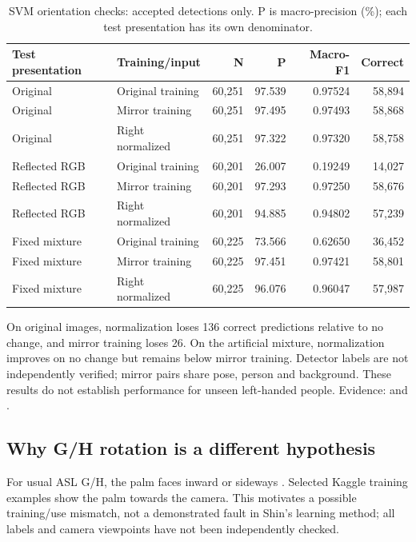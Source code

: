 \begin{table}[h]\centering\small
\caption{SVM orientation checks: accepted detections only. P is macro-precision (\%); each test presentation has its own denominator.}
\begin{tabular}{llrrrr}\toprule
Test presentation & Training/input & N & P & Macro-F1 & Correct\\\midrule
Original & Original training & 60,251 & 97.539 & 0.97524 & 58,894 \\
Original & Mirror training & 60,251 & 97.495 & 0.97493 & 58,868 \\
Original & Right normalized & 60,251 & 97.322 & 0.97320 & 58,758 \\
Reflected RGB & Original training & 60,201 & 26.007 & 0.19249 & 14,027 \\
Reflected RGB & Mirror training & 60,201 & 97.293 & 0.97250 & 58,676 \\
Reflected RGB & Right normalized & 60,201 & 94.885 & 0.94802 & 57,239 \\
Fixed mixture & Original training & 60,225 & 73.566 & 0.62650 & 36,452 \\
Fixed mixture & Mirror training & 60,225 & 97.451 & 0.97421 & 58,801 \\
Fixed mixture & Right normalized & 60,225 & 96.076 & 0.96047 & 57,987 \\
\bottomrule\end{tabular}
\end{table}

On original images, normalization loses 136 correct predictions relative to no change, and mirror training loses 26. On the artificial mixture, normalization improves on no change but remains below mirror training. Detector labels are not independently verified; mirror pairs share pose, person and background. These results do not establish performance for unseen left-handed people. Evidence:  and .

\subsection{Why G/H rotation is a different hypothesis}
For usual ASL G/H, the palm faces inward or sideways \citep{ton-vicarsfeedback}. Selected Kaggle training examples show the palm towards the camera. This motivates a possible training/use mismatch, not a demonstrated fault in Shin's learning method; all labels and camera viewpoints have not been independently checked.


